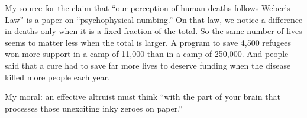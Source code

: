 My source for the claim that ``our perception of human deaths follows Weber's Law'' is a paper on ``psychophysical numbing.'' On that law, we notice a difference in deaths only when it is a fixed fraction of the total. So the same number of lives seems to matter less when the total is larger.  A program to save 4,500 refugees won more support in a camp of 11,000 than in a camp of 250,000.  And people said that a cure had to save far more lives to deserve funding when the disease killed more people each year. 

My moral: an effective altruist must think ``with the part of your brain that processes those unexciting inky zeroes on paper.'' 
